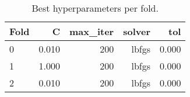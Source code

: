 \begin{table}
\caption{Best hyperparameters per fold.}
\label{tab:hyperparams}
\begin{tabular}{lrrrr}
\toprule
Fold & C & max\_iter & solver & tol \\
\midrule
0 & 0.010 & 200 & lbfgs & 0.000 \\
1 & 1.000 & 200 & lbfgs & 0.000 \\
2 & 0.010 & 200 & lbfgs & 0.000 \\
\bottomrule
\end{tabular}
\end{table}

